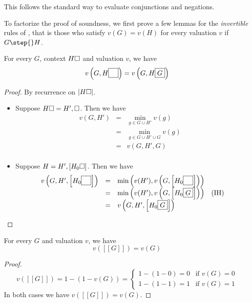 \begin{scope}
This follows the standard way to evaluate conjunctions and negations.

To factorize the proof of soundness, we first prove a few lemmas for the
\emph{invertible} rules of , that is those who satisfy $v(G) = v(H)$
for every valuation $v$ if $G \step{} H$.

\begin{lemma}[Iteration]
  For every  $G$, context $H\square$ and valuation $v$, we have
  $$v\left(G, H\fbox{$\phantom{G}$}\right) = v\left(G, H\fbox{$G$}\right)$$
\end{lemma}
\begin{proof}
  By recurrence on $\left|H\square\right|$.

  \def\arraystretch{1.5}
  \begin{itemize}
    \item[\bcase]
      Suppose $H\square = H', \square$. Then we have
      $$
      \begin{array}{rcll}
        v(G, H')
        &=& \min_{g \in G \cup H'}{v(g)} & \\
        &=& \min_{g \in G \cup H' \cup G}{v(g)} & \\
        &=& v(G, H', G) & \\
      \end{array}
      $$
    \item[\rcase]
      Suppose $H = H', [H_0\square]$. Then we have
      $$
      \begin{array}{rcll}
        v\left(G, H', \left[H_0\fbox{$\phantom{G}$}\right]\right)
        &=& \min\left(v(H'), v\left(G, \left[H_0\fbox{$\phantom{G}$}\right]\right)\right) & \\
        &=& \min\left(v(H'), v\left(G, \left[H_0\fbox{$G$}\right]\right)\right) &\text{(IH)} \\
        &=& v\left(G, H', \left[H_0\fbox{$G$}\right]\right) & \\
      \end{array}
      $$
  \end{itemize}
\end{proof}

\begin{lemma}
  For every  $G$ and valuation $v$, we have
  $$v([[G]]) = v(G)$$
\end{lemma}
\begin{proof}
  $$
  v([[G]]) = 1 - (1 - v(G)) = \begin{cases}
    1 - (1 - 0) = 0 &\text{if $v(G) = 0$} \\
    1 - (1 - 1) = 1 &\text{if $v(G) = 1$}
  \end{cases}
  $$
  In both cases we have $v([[G]]) = v(G)$.
\end{proof}


\end{scope}
